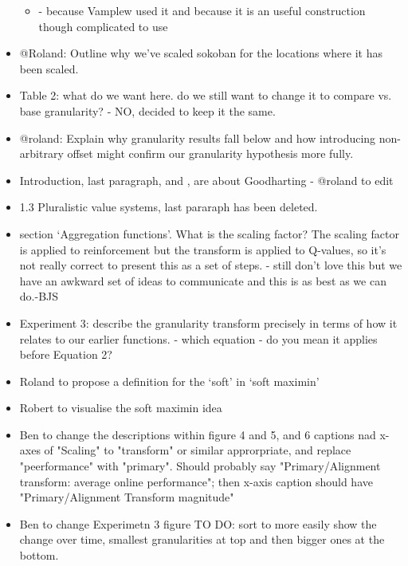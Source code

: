 \begin{itemize}
\begin{itemize}
        \item \tloA{} - because Vamplew used it and because it is an useful construction though complicated to use
    \end{itemize}
    \item @Roland: Outline why we've scaled sokoban for the locations where it has been scaled.
    \item Table 2: what do we want here. do we still want to change it to compare vs. base granularity? - NO, decided to keep it the same.
    \item @roland: Explain why granularity results fall below \tloA{} and how introducing non-arbitrary offset might confirm our granularity hypothesis more fully.
    \item Introduction, last paragraph, and , are about Goodharting - @roland to edit
    \item 1.3 Pluralistic value systems, last pararaph has been deleted.
        
    \item section `Aggregation functions'. What is the scaling factor? The scaling factor is applied to reinforcement but the transform is applied to Q-values, so it's not really correct to present this as a set of steps. - still don't love this but we have an awkward set of ideas to communicate and this is as best as we can do.-BJS
    \item Experiment 3: describe the granularity transform precisely in terms of how it relates to our earlier functions. - which equation - do you mean it applies before Equation 2?
    \item Roland to propose a definition for the `soft' in `soft maximin'
    \item Robert to visualise the soft maximin idea
    \item Ben to change the descriptions within figure 4 and 5, and 6 captions nad x-axes of "Scaling" to "transform" or similar approrpriate, and replace "peerformance" with "primary". Should probably say "Primary/Alignment transform: average online performance"; then x-axis caption should have "Primary/Alignment Transform magnitude"
    \item Ben to change Experimetn 3 figure TO DO: sort to more easily show the change over time, smallest granularities at top and then bigger ones at the bottom.
\end{itemize}
    
 